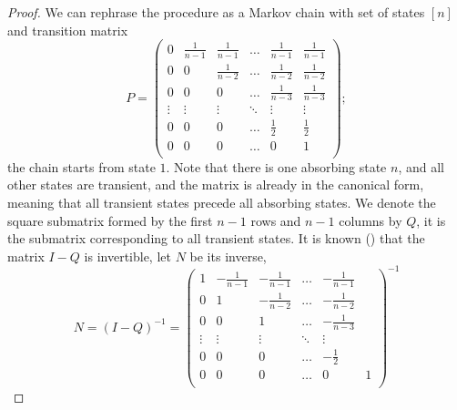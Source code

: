 \documentclass[a4paper,USenglish]{socg-lipics-v2018}
\begin{document}
\begin{proof}
We can rephrase the procedure as a Markov chain with set of states $[n]$ and transition matrix
\begin{equation}
    P = \begin{pmatrix}
         0      & \frac{1}{n-1} & \frac{1}{n-1} & \dots  & \frac{1}{n-1} & \frac{1}{n-1} \\
         0      &  0            & \frac{1}{n-2} & \dots  & \frac{1}{n-2} & \frac{1}{n-2} \\
         0      &  0            & 0             & \dots  & \frac{1}{n-3} & \frac{1}{n-3} \\
         \vdots &  \vdots       & \vdots        & \ddots & \vdots        & \vdots \\
         0      &  0            & 0             & \dots  & \frac{1}{2} & \frac{1}{2} \\
         0      &  0            & 0             & \dots  & 0           & 1           \\
        \end{pmatrix};
\end{equation}
the chain starts from state $1$.
Note that there is one absorbing state $n$, and all other states are transient, and the matrix is already in the canonical
form, meaning that all transient states precede all absorbing states. 
We denote the square submatrix formed by the first $n-1$
rows and $n-1$ columns by $Q$, it is the submatrix corresponding to all transient states. It is known
(\cite{absorbing_markov_chain}) that the matrix $I-Q$ is invertible, let $N$ be its inverse,
\begin{equation}
N = (I- Q)^{-1} = 
\begin{pmatrix}
         1      & -\frac{1}{n-1} & -\frac{1}{n-1} & \dots  & -\frac{1}{n-1}  \\
         0      &  1             & -\frac{1}{n-2} & \dots  & -\frac{1}{n-2}  \\
         0      &  0             & 1             & \dots  & -\frac{1}{n-3}   \\
         \vdots &  \vdots       & \vdots        & \ddots & \vdots            \\
         0      &  0            & 0             & \dots  & -\frac{1}{2}      \\
         0      &  0            & 0             & \dots  & 0           & 1   \\
        \end{pmatrix}^{-1}
\end{equation}

\end{proof}
\end{document}
